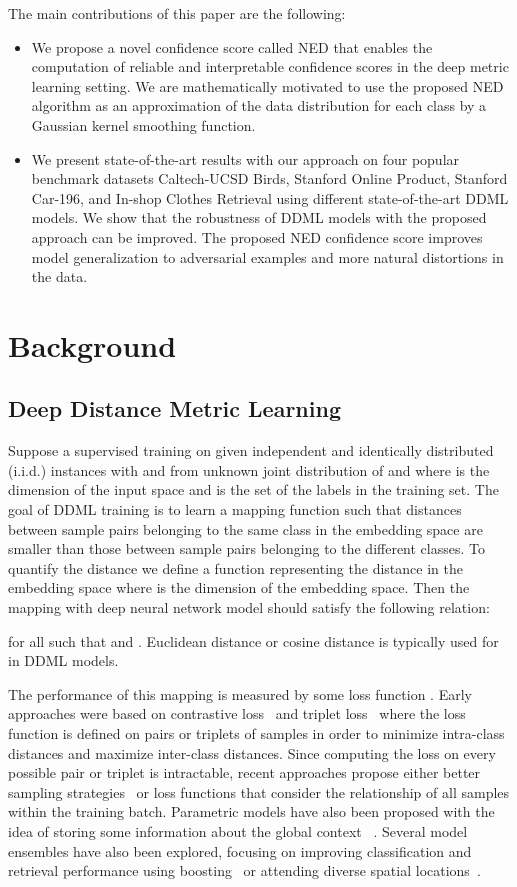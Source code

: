 \documentclass{article}
\begin{document}
The main contributions of this paper are the following:
\begin{itemize}
	\item We propose a novel confidence score called NED that enables the computation of reliable and interpretable confidence scores in the deep metric learning setting. We are mathematically motivated to use the proposed NED algorithm as an approximation of the data distribution for each class by a Gaussian kernel smoothing function.
	\item We present state-of-the-art results with our approach on four popular benchmark datasets Caltech-UCSD Birds,  Stanford Online Product, Stanford Car-196, and In-shop Clothes Retrieval using different state-of-the-art DDML models. We show that the robustness of DDML models with the proposed approach can be improved. The proposed NED confidence score improves model generalization to adversarial examples and more natural distortions in the data.
\end{itemize}

\section{Background}

\subsection{Deep Distance Metric Learning}
Suppose  a supervised training on given  independent and identically distributed (i.i.d.) instances
 with  and  from unknown joint distribution of  and 
where
 is the dimension of the input space and
 is the set of the labels in the training set.
The goal of DDML training is to learn a mapping function 
such that distances between sample pairs belonging to the same class in the embedding space
are smaller than
those between sample pairs belonging to the different classes.
To quantify the distance we define a function 
representing the distance in the embedding space where   is the dimension of the embedding space.
Then the mapping  with deep neural network model should satisfy the following relation:

for all  such that  and . Euclidean distance or cosine distance is typically used for  in DDML models.

The performance of this mapping is measured by some loss function . Early approaches were based on contrastive loss~\cite{contrastiveloss} and triplet loss~\cite{tripletloss}
where the loss function is defined on pairs or triplets of samples in order to minimize intra-class distances and maximize inter-class distances. Since computing the loss on every possible pair or triplet is intractable, recent approaches propose either better sampling strategies~\cite{b4, b16, hierarchical_triplet} or loss functions that consider the relationship of all samples within the training batch. Parametric models have also been proposed with the idea of storing some information about the global context ~\cite{b1, normproxies, ddml_deep_face_recognition}. Several model ensembles have also been explored, focusing on improving classification and retrieval performance using boosting~\cite{BIER} or attending diverse spatial locations~\cite{WonsikAttentionEnsemble}.
\end{document}
